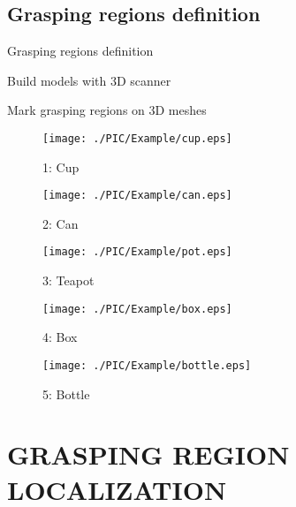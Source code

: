 \documentclass[xcolor=table,compress,blue]{beamer}
\begin{document}
\subsection{Grasping regions definition}
\begin{frame}{Grasping regions definition}
	\begin{exampleblock}{Build models with 3D scanner}
		
	\end{exampleblock}
	\begin{exampleblock}{Mark grasping regions on 3D meshes}
		\begin{figure}[htpb]
			\centering
			\begin{minipage}[b]{0.8in}
				\centerline{\texttt{[image: ./PIC/Example/cup.eps]}}
				\centerline{\small{1: Cup}}
			\end{minipage}
			\begin{minipage}[b]{0.8in}
				\centerline{\texttt{[image: ./PIC/Example/can.eps]}}
				\centerline{\small{2: Can}}
			\end{minipage}
			\begin{minipage}[b]{0.8in}
				\centerline{\texttt{[image: ./PIC/Example/pot.eps]}}
				\centerline{\small{3: Teapot}}
			\end{minipage}
			\begin{minipage}[b]{0.8in}
				\centerline{\texttt{[image: ./PIC/Example/box.eps]}}
				\centerline{\small{4: Box}}
			\end{minipage}
			\begin{minipage}[b]{0.8in}
				\centerline{\texttt{[image: ./PIC/Example/bottle.eps]}}
				\centerline{\small{5: Bottle}}
			\end{minipage}
			\label{fig:Models} %
		\end{figure}
	\end{exampleblock}
\end{frame}



\section{GRASPING REGION LOCALIZATION}
\end{document}

